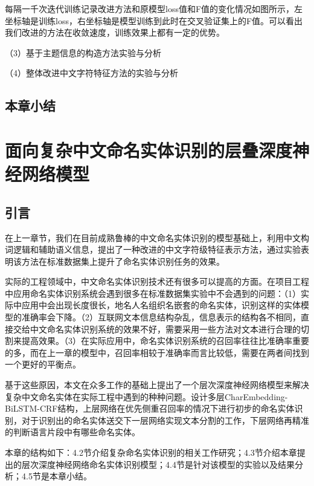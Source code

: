 \documentclass[winfonts,master,oneside,nobackinfo]{njuthesis}
\begin{document}
每隔一千次迭代训练记录改进方法和原模型loss值和F值的变化情况如图所示，左坐标轴是训练loss，右坐标轴是模型训练到此时在交叉验证集上的F值。可以看出我们改进的方法在收敛速度，训练效果上都有一定的优势。

（3）基于主题信息的构造方法实验与分析




（4）整体改进中文字符特征方法的实验与分析




\section{本章小结}





\chapter{面向复杂中文命名实体识别的层叠深度神经网络模型}

\section{引言}

在上一章节，我们在目前成熟鲁棒的中文命名实体识别的模型基础上，利用中文构词逻辑和辅助语义信息，提出了一种改进的中文字符级特征表示方法，通过实验表明该方法在标准数据集上提升了命名实体识别任务的效果。

实际的工程领域中，中文命名实体识别技术还有很多可以提高的方面。在项目工程中应用命名实体识别系统会遇到很多在标准数据集实验中不会遇到的问题：（1）实际中应用中会出现长度很长，地名人名组织名嵌套的命名实体，识别这样的实体模型的准确率会下降。（2）互联网文本信息结构杂乱，信息表示的结构各不相同，直接交给中文命名实体识别系统的效果不好，需要采用一些方法对文本进行合理的切割来提高效果。（3）在实际应用中，命名实体识别系统的召回率往往比准确率重要的多，而在上一章的模型中，召回率相较于准确率而言比较低，需要在两者间找到一个更好的平衡点。

基于这些原因，本文在众多工作的基础上提出了一个层次深度神经网络模型来解决复杂中文命名实体在实际工程中遇到的种种问题。设计多层CharEmbedding-BiLSTM-CRF结构，上层网络在优先侧重召回率的情况下进行初步的命名实体识别，对于识别出的命名实体送交下一层网络实现文本分割的工作，下层网络再精准的判断语言片段中有哪些命名实体。

本章的结构如下：4.2节介绍复杂命名实体识别的相关工作研究；4.3节介绍本章提出的层次深度神经网络命名实体识别模型；4.4节是针对该模型的实验以及结果分析；4.5节是本章小结。
\end{document}
